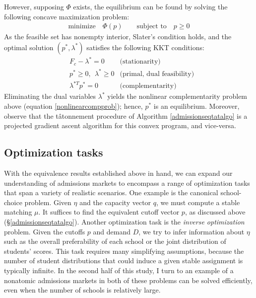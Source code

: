 \documentclass[12pt]{article}
\theoremstyle{definition}
\begin{document}
However, supposing $\Phi$ exists, the equilibrium can be found by solving the following concave maximization problem:
\begin{align*}
\text{minimize} \quad \Phi(p) \qquad \text{subject to} \quad  p \geq 0 
\end{align*}
As the feasible set has nonempty interior, Slater's condition holds, and the optimal solution $(p^*, \lambda^*)$ satisfies the following KKT conditions:
\begin{align*}
&F_c - \lambda^* = 0 & \text{(stationarity)}\\
&p^* \geq 0, ~~ \lambda^* \geq 0  & \text{(primal, dual feasibility)}\\
&\lambda^{*T} p^*=0  & \text{(complementarity)}
\end{align*}
Eliminating the dual variables $\lambda^*$ yields the nonlinear complementarity problem above (equation \eqref{nonlinearcompprob}); hence, $p^*$ is an equilibrium. Moreover, observe that the t\^{a}tonnement procedure of Algorithm \ref{admissionseqtatalgo} is a projected gradient ascent algorithm for this convex program, and vice-versa. 

\subsection{Optimization tasks}
With the equivalence results established above in hand, we can expand our understanding of admissions markets to encompass a range of optimization tasks that span a variety of realistic scenarios. One example is the canonical school-choice problem. Given $\eta$ and the capacity vector $q$, we must compute a stable matching $\mu$. It suffices to find the equivalent cutoff vector $p$, as discussed above (\S\ref{admissionseqtatalgo}). Another optimization task is the \emph{inverse optimization} problem. Given the cutoffs $p$ and demand $D$, we try to infer information about $\eta$ such as the overall preferability of each school or the joint distribution of students' scores. This task requires many simplifying assumptions, because the number of student distributions that could induce a given stable assignment is typically infinite. In the second half of this study, I turn to an example of a nonatomic admissions markets in both of these problems can be solved efficiently, even when the number of schools is relatively large. 







\pagebreak
\end{document}
